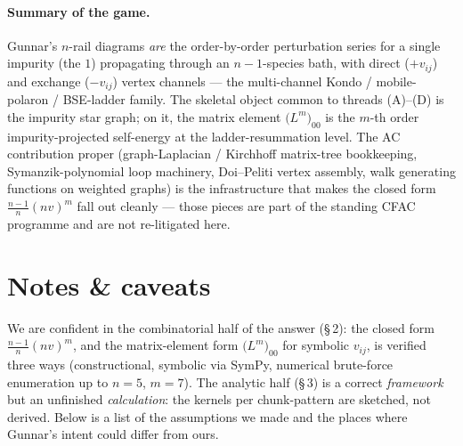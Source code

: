 \documentclass[11pt,a4paper]{article}
\begin{document}
\paragraph{Summary of the game.}
Gunnar's $n$-rail diagrams \emph{are} the order-by-order perturbation
series for a single impurity (the $1$) propagating through an
$n{-}1$-species bath, with direct ($+v_{ij}$) and exchange ($-v_{ij}$)
vertex channels --- the multi-channel Kondo / mobile-polaron / BSE-ladder
family. The skeletal object common to threads (A)--(D) is the impurity
star graph; on it, the matrix element $\big(L^m\big)_{00}$ is the
$m$-th order impurity-projected self-energy at the ladder-resummation
level. The AC contribution proper (graph-Laplacian / Kirchhoff matrix-tree
bookkeeping, Symanzik-polynomial loop machinery, Doi--Peliti vertex
assembly, walk generating functions on weighted graphs) is the
infrastructure that makes the closed form $\frac{n-1}{n}(nv)^m$ fall
out cleanly --- those pieces are part of the standing CFAC programme and
are not re-litigated here.

\endgroup

\section{Notes \& caveats}\label{sec:caveats}

We are confident in the combinatorial half of the answer
(\S\,2): the closed form $\frac{n-1}{n}(nv)^m$, and the matrix-element form
$\big(L^m\big)_{00}$ for symbolic $v_{ij}$, is verified three ways
(constructional, symbolic via SymPy, numerical brute-force enumeration up to
$n{=}5$, $m{=}7$). The analytic half (\S\,3) is a correct \emph{framework}
but an unfinished \emph{calculation}: the kernels per chunk-pattern are
sketched, not derived. Below is a list of the assumptions we made and the
places where Gunnar's intent could differ from ours.
\end{document}
